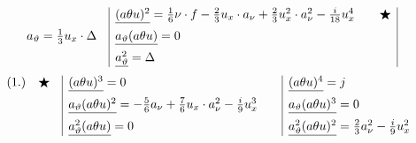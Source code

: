 
\begingroup\small
\[
\begin{array}{r@{\quad}|l@{\qquad}c|}
& \underline{(a\theta u)^2}=\frac16\nu\cdot f-\frac23u_x\cdot a_\nu+\frac23u_x^2\cdot a_\nu^2-\frac{i}{18}u_x^4
& \bigstar\\[0.55em]
a_\vartheta=\frac13u_x\cdot\Delta
& \underline{a_\vartheta(a\theta u)}=0
& \\[0.55em]
& \underline{a_\vartheta^2}=\Delta
&
\end{array}
\]
\vspace{-0.5em}
\[
\begin{array}{r@{\quad}c@{\quad}|l@{\qquad}|l}
(1.) & \bigstar
& \underline{(a\theta u)^3}=0
& \underline{(a\theta u)^4}=j\\[0.55em]
&
& \underline{a_\vartheta(a\theta u)^2}=-\frac56a_\nu+\frac76u_x\cdot a_\nu^2-\frac{i}{9}u_x^3
& \underline{a_\vartheta(a\theta u)^3}=0\\[0.55em]
&
& \underline{a_\vartheta^2(a\theta u)}=0
& \underline{a_\vartheta^2(a\theta u)^2}=\frac23a_\nu^2-\frac{i}{9}u_x^2
\end{array}
\]
\endgroup
